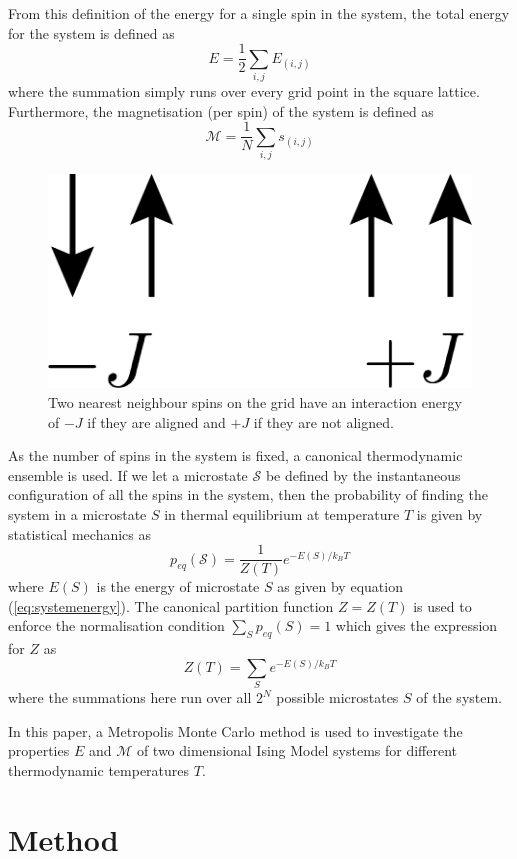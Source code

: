 \documentclass[11pt]{iopart}
\begin{document}
From this definition of the energy for a single spin in the system, the total energy for the system is defined as
\begin{equation}
\label{eq:systemenergy}
E = \frac{1}{2} \sum_{i, j} E_{(i, j)}
\end{equation}
where the summation simply runs over every grid point in the square lattice.
Furthermore, the magnetisation (per spin) of the system is defined as
\begin{equation}
\mathcal{M} = \frac{1}{N} \sum_{i, j} s_{(i, j)}
\end{equation}

\begin{figure}[t]
  \centering
  \includegraphics[width=0.2\linewidth]{images/spins/4x/spins@4x.png}
  \caption{Two nearest neighbour spins on the grid have an interaction energy of $-J$ if they are aligned and $+J$ if they are not aligned.}
  \label{fig:spinalignment}
\end{figure}

As the number of spins in the system is fixed, a canonical thermodynamic ensemble is used. If we let a microstate $\mathcal{S}$ be defined by the instantaneous configuration of all the spins in the system, then the probability of finding the system in a microstate $S$ in thermal equilibrium at temperature $T$ is given by statistical mechanics as
\begin{equation}
p_{eq}(\mathcal{S}) = \frac{1}{Z(T)} e^{-E(S)/k_B T}
\end{equation}
where $E(S)$ is the energy of microstate $S$ as given by equation (\ref{eq:systemenergy}). The canonical partition function $Z = Z(T)$ is used to enforce the normalisation condition $\sum_S{p_{eq}(S)} = 1$ which gives the expression for $Z$ as
\begin{equation}
Z(T) = \sum_{S} e^{-E(S)/k_B T}
\end{equation}
where the summations here run over all $2^N$ possible microstates $S$ of the system.

In this paper, a Metropolis Monte Carlo method is used to investigate the properties $E$ and $\mathcal{M}$ of two dimensional Ising Model systems for different thermodynamic temperatures $T$.  

\section{Method}
\end{document}
